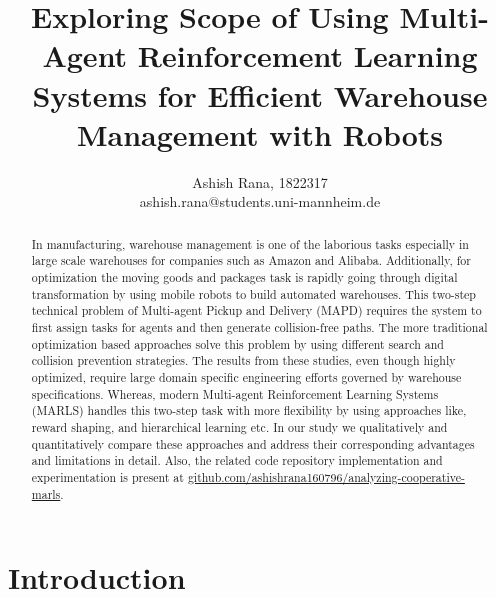 \documentclass{article}
\title{Exploring Scope of Using Multi-Agent Reinforcement Learning Systems for Efficient Warehouse Management with Robots}
\author{Ashish Rana, 1822317 \\
        ashish.rana@students.uni-mannheim.de}
\begin{document}
\maketitle
\tableofcontents %
\listoftables %
\newpage


\begin{abstract}


In manufacturing, warehouse management is one of the laborious tasks especially in large scale warehouses for companies such as Amazon and Alibaba.
Additionally, for optimization the moving goods and packages task is rapidly going through digital transformation by using mobile robots to build automated warehouses.
This two-step technical problem of Multi-agent Pickup and Delivery (MAPD) requires the system to first assign tasks for agents and then generate collision-free paths.
The more traditional optimization based approaches solve this problem by using different search and collision prevention strategies.
The results from these studies, even though highly optimized, require large domain specific engineering efforts governed by warehouse specifications.
Whereas, modern Multi-agent Reinforcement Learning Systems (MARLS) handles this two-step task with more flexibility by using approaches like, reward shaping, and hierarchical learning etc.
In our study we qualitatively and quantitatively compare these approaches and address their corresponding advantages and limitations in detail.
Also, the related code repository implementation and experimentation is present at \href{https://github.com/ashishrana160796/analyzing-cooperative-marls}{github.com/ashishrana160796/analyzing-cooperative-marls}.


\end{abstract}


\section{Introduction}
\end{document}
